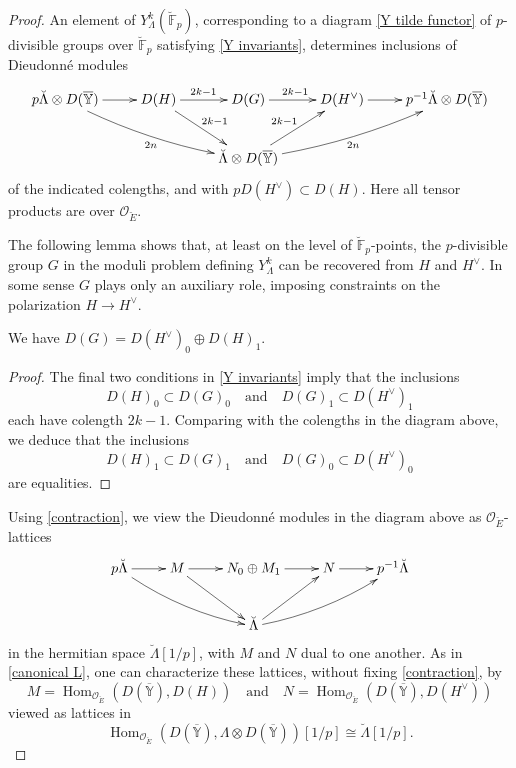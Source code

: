 \documentclass[11pt]{alggeom}
\newcommand{\iso}{\cong}
\newcommand{\F}{\mathbb F}
\newcommand{\co}{\mathcal O}
\DeclareMathOperator{\Hom}{Hom}
\begin{document}
\begin{proof}
An element of  $Y^k_\Lambda(\breve{\F}_p)$, corresponding to a diagram \eqref{Y tilde functor} of $p$-divisible groups over $\breve{\F}_p$ satisfying \eqref{Y invariants},  determines inclusions of Dieudonn\'e modules 
\[
\xymatrix{
{p \breve{\Lambda} \otimes  D( \overline{\mathbb{Y}})  }\ar[r]     \ar@/_/[drr]_{2n}  &  {  D(H)  }  \ar[dr]^{2k-1}  \ar[r]^{ 2k-1 }&  {D(G)}  \ar[r]^{2k-1  } & { D(H^\vee)}  \ar[r]  & {p^{-1} \breve{\Lambda} \otimes  D(\overline{\mathbb{Y}})  } \\
& &  { \breve{\Lambda} \otimes  D(\overline{\mathbb{Y} }) } \ar[ur]^{2k-1} \ar@/_/[urr]_{2n}
}
\]
of the indicated colengths, and with $pD(H^\vee) \subset D(H)$.   Here all tensor products are over $\co_{\breve{E}}$.


The following lemma shows that, at least on the level of $\breve{\F}_p$-points, the $p$-divisible group  $G$ in the moduli problem defining $Y_\Lambda^k$ can be recovered from $H$ and $H^\vee$.  
In some sense $G$ plays only an auxiliary role, imposing constraints on the polarization $H\to H^\vee$.



\begin{lemma}\label{lem:intermediate crystal}
We have
$
D(G) = D(H^\vee)_0 \oplus D(H)_1. 
$
\end{lemma}

\begin{proof}
The final two conditions in \eqref{Y invariants} imply that the inclusions 
\[
D(H)_0  \subset D(G)_0 \quad \mbox{and}\quad D(G)_1\subset D(H^\vee)_1
\]
 each have colength $2k-1$.  Comparing with the colengths in the diagram above, we deduce that the inclusions 
 \[
 D(H)_1  \subset D(G)_1 \quad \mbox{and}\quad D(G)_0\subset D(H^\vee)_0
 \]
  are equalities.
\end{proof}

Using \eqref{contraction}, we view the Dieudonn\'e modules in the diagram above as $\co_{\breve{E}}$-lattices 
\begin{equation}\label{fake minuscule lattices}
\xymatrix{
{p \breve{\Lambda}   }\ar[r]     \ar@/_/[drr]  &  {M} \ar[dr]   \ar[r] & { N_0 \oplus M_1 }  \ar[r] & { N }  \ar[r]  & {p^{-1}  \breve{\Lambda }  } \\
& &  {  \breve{\Lambda} } \ar[ur] \ar@/_/[urr]
}
\end{equation}
in the hermitian space $ \breve{\Lambda}[1/p]$,  with $M$ and $N$  dual to one another.
As in  \eqref{canonical L}, one can characterize these lattices, without fixing \eqref{contraction}, by 
\begin{equation}\label{MNlattices}
M  = \Hom_{\co_{\breve{E}}} (D(\overline{\mathbb{Y}}) , D(H) ) 
\quad \mbox{and}\quad 
N  = \Hom_{\co_{\breve{E}}} (D(\overline{\mathbb{Y}}) , D(H^\vee) ) 
\end{equation}
viewed as lattices  in
\[
 \Hom_{\co_{\breve{E}}} (D(\overline{\mathbb{Y}}) ,    \Lambda \otimes  D(\overline{\mathbb{Y} })   )[1/p]  
\iso  \breve{\Lambda}[1/p]  .
\]






\end{proof}
\end{document}
